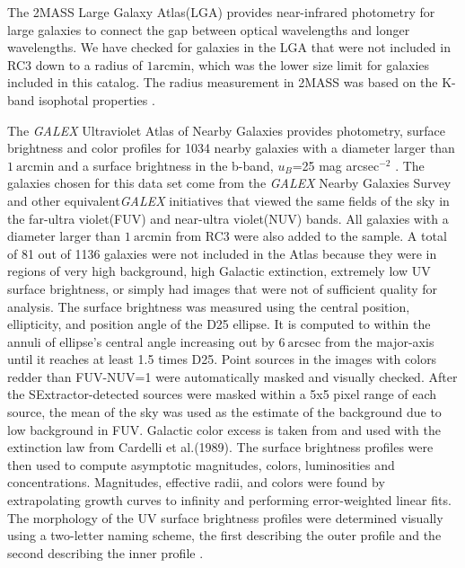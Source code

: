 \documentclass[12pt,preprint,pdftex]{aastex}
\newcommand{\units}[1]{\mathrm{#1}}
\renewcommand{\arcmin}{\units{arcmin}}
\renewcommand{\arcsec}{\units{arcsec}}
\begin{document}
The 2MASS Large Galaxy Atlas(LGA) provides near-infrared photometry for large galaxies to connect the gap between optical wavelengths and longer wavelengths. We have checked for galaxies in the LGA that were not included in RC3 down to a radius of $1\arcmin$, which was the lower size limit for galaxies included in this catalog. The radius measurement in 2MASS was based on the K-band isophotal properties \citep{jarrett03}.  

The \textit{GALEX} Ultraviolet Atlas of Nearby Galaxies provides photometry, surface brightness and color profiles for 1034 nearby galaxies with a diameter larger than $1~\arcmin$ and a surface brightness in the b-band, $u_B$=25 mag arcsec$^{-2}$ . The galaxies chosen for this data set come from the \textit{GALEX} Nearby Galaxies Survey and other equivalent\textit{GALEX} initiatives that viewed the same fields of the sky in the far-ultra violet(FUV) and near-ultra violet(NUV) bands. All galaxies with a diameter larger than $1~\arcmin$ from RC3 were also added to the sample. A total of 81 out of 1136 galaxies were not included in the Atlas because they were in regions of very high background, high Galactic extinction, extremely low UV surface brightness, or simply had images that were not of sufficient quality for analysis. The surface brightness was measured using the central position, ellipticity, and position angle of the D25 ellipse. It is computed to within the annuli of ellipse's central angle increasing out by $6~\arcsec$ from the major-axis until it reaches at least 1.5 times D25. Point sources in the images with colors redder than FUV-NUV=1 were automatically masked and visually checked. After the SExtractor-detected sources were masked within a 5x5 pixel range of each source, the mean of the sky was used as the estimate of the background due to low background in FUV. Galactic color excess is taken from \citep{schlegel98} and used with the extinction law from Cardelli et al.(1989). The surface brightness profiles were then used to compute asymptotic magnitudes, colors, luminosities and concentrations. Magnitudes, effective radii, and colors were found by extrapolating growth curves to infinity and performing error-weighted linear fits. The morphology of the UV surface brightness profiles were determined visually using a two-letter naming scheme, the first describing the outer profile and the second describing the inner profile \citep{gdp06}.
\end{document}
